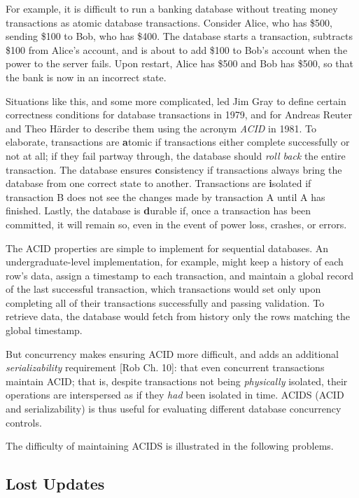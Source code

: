 \documentclass[12pt]{article} %
\begin{document}
For example, it is difficult to run a banking database without treating money transactions as atomic database transactions. Consider Alice, who has \$500, sending \$100 to Bob, who has \$400. The database starts a transaction, subtracts \$100 from Alice's account, and is about to add \$100 to Bob's account when the power to the server fails.  Upon restart, Alice has \$500 and Bob has \$500, so that the bank is now in an incorrect state. 

Situations like this, and some more complicated, led Jim Gray to define certain correctness conditions for database transactions in 1979, and for Andreas Reuter and Theo H{\"a}rder to describe them using the acronym \textsl{ACID} in 1981. To elaborate, transactions are \textbf{a}tomic if transactions either complete successfully or not at all; if they fail partway through, the database should \textsl{roll back} the entire transaction. The database ensures \textbf{c}onsistency if transactions always bring the database from one correct state to another. Transactions are \textbf{i}solated if transaction B does not see the changes made by transaction A until A has finished. Lastly, the database is \textbf{d}urable if, once a transaction has been committed, it will remain so, even in the event of power loss, crashes, or errors.

The ACID properties are simple to implement for sequential databases. An undergraduate-level implementation, for example, might keep a history of each row's data, assign a timestamp to each transaction, and maintain a global record of the last successful transaction, which transactions would set only upon completing all of their transactions successfully and passing validation. To retrieve data, the database would fetch from history only the rows matching the global timestamp.

But concurrency makes ensuring ACID more difficult, and adds an additional \textsl{serializability} requirement [Rob Ch. 10]: that even concurrent transactions maintain ACID; that is, despite transactions not being \textsl{physically} isolated, their operations are interspersed as if they \textsl{had} been isolated in time. ACIDS (ACID and serializability) is thus useful for evaluating different database concurrency controls.

The difficulty of maintaining ACIDS is illustrated in the following problems.

\subsection{Lost Updates}
\end{document}
